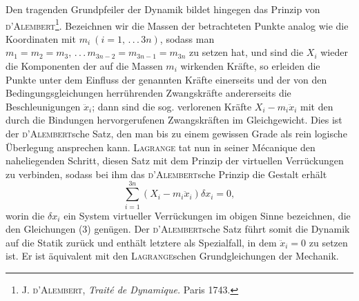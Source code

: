 Den tragenden Grundpfeiler der Dynamik bildet hingegen das Prinzip
von \textsc{d’Alembert}\footnote{J. \textsc{d’Alembert}, \textit{Traité de Dynamique.} Paris 1743.}. Bezeichnen wir die Massen der betrachteten Punkte analog
wie die Koordinaten mit $m_i\ (i=1,\, .\, .\, .\, 3n)$, sodass man $m_1=m_2=m_3,\, .\, .\, .\,
m_{3n-2}=m_{3n-1}=m_{3n}$ zu setzen hat, und sind die $X_i$ wieder die Komponenten
der auf die Massen $m_i$ wirkenden Kräfte, so erleiden die Punkte unter dem Einfluss
der genannten Kräfte einerseits und der von den Bedingungsgleichungen
herrührenden Zwangskräfte andererseits die Beschleunigungen $\ddot x_i$; dann sind die
sog. verlorenen Kräfte $X_i-m_i\ddot x_i$ mit den durch die Bindungen hervorgerufenen
Zwangskräften im Gleichgewicht. Dies ist der \textsc{d’Alembert}sche Satz, den man
bis zu einem gewissen Grade als rein logische Überlegung ansprechen kann.
\textsc{Lagrange} tat nun in seiner Mécanique den naheliegenden Schritt, diesen Satz
mit dem Prinzip der virtuellen Verrückungen zu verbinden, sodass bei ihm
das \textsc{d’Alembert}sche Prinzip die Gestalt erhält
\[
\sum_{i=1}^{3n}(X_i-m_i\ddot x_i)\delta x_i=0,\tag{4}
\]
\clearpage{}
\noindent worin die $\delta x_i$ ein System virtueller Verrückungen im obigen Sinne bezeichnen,
die den Gleichungen (3) genügen. Der \textsc{d’Alembert}sche Satz führt somit die
Dynamik auf die Statik zurück und enthält letztere als Spezialfall, in dem
$\ddot x_i=0$ zu setzen ist. Er ist äquivalent mit den \textsc{Lagrange}schen Grundgleichungen
der Mechanik.
\clearpage\endgroup
